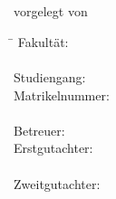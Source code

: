 \begin{titlepage}
\begin{figure}[h]
\end{figure}

\vfill
\vspace{10mm}

\large
\begin{center}
	
	\noindent { 
		\color{uhhred}\textbf{\MakeUppercase \thesisType}
	}
	\vspace{2.0cm}\\
	\textbf{\Large \myTitle} 
	\vspace{2.0cm}\\ vorgelegt von
	\vspace{0.4cm}\\
	\myName
	
\end{center}

\vfill

\begin{tabbing}
	\hspace{10em} \=  \kill
	Fakultät: \>  \faculty \\
	\> \fachbereich \\
	Studiengang: \>  \courseOfStudies \\ %
	Matrikelnummer: \>  \myMatNr \\ \\
	Betreuer: \> \supervisor \\
	Erstgutachter: \> \primaryReferee \\
	\>	\primaryRefereeInst \\
	Zweitgutachter: \> \secondaryReferee \\
	\>	\secondaryRefereeInst \\
\end{tabbing}
	

\newpage 
	
\thispagestyle{empty}
\setcounter{page}{0}

~\\ \vfill \noindent 
\optionalQuote

\end{titlepage}

